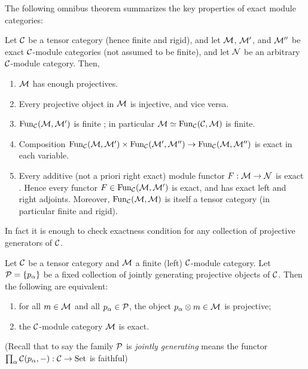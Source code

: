 \documentclass{amsart}
\begin{document}
The following omnibus theorem summarizes the key properties of exact module categories: 
\begin{theorem} \label{Thm:ExactModCatOmnibus}
	Let $\mathcal C$ be a tensor category (hence finite and rigid), and let $\mathcal M$, $\mathcal M'$, and $\mathcal M''$ be exact $\mathcal C$-module categories (not assumed to be finite), and let $\mathcal N$ be an arbitrary $\mathcal C$-module category. Then,
	\begin{enumerate}
		\item $\mathcal M$ has enough projectives. \cite[Lemma 2.7.1]{EGNO}
		\item Every projective object in $\mathcal M$  is injective, and vice versa. \cite[Cor 2.7.4]{EGNO}
		\item $\operatorname{Fun}_{\mathcal C}(\mathcal M, \mathcal M')$ is finite \cite[Prop 2.13.5]{EGNO}; in particular $\mathcal M \simeq \operatorname{Fun}_{\mathcal C}(\mathcal C, \mathcal M)$ is finite.
		\item Composition $\operatorname{Fun}_{\mathcal C}(\mathcal M, \mathcal M') \times \operatorname{Fun}_{\mathcal C}(\mathcal M', \mathcal M'') \to \operatorname{Fun}_{\mathcal C}(\mathcal M, \mathcal M'')$ is exact in each variable. \cite[Lemma 2.13.2]{EGNO}		
		\item Every additive (not a priori right exact) module functor $F:\mathcal M \to \mathcal N$ is exact \cite[Prop 2.7.8]{EGNO}. Hence every functor $F \in \operatorname{Fun}_{\mathcal C}(\mathcal M, \mathcal M')$ is exact, and has exact left and right adjoints. Moreover, $\operatorname{Fun}_{\mathcal C}(\mathcal M,\mathcal M)$ is itself a tensor category (in particular finite and rigid). 
	\end{enumerate}
\end{theorem}

\noindent In fact it is enough to check exactness condition for any collection of projective generators of $\mathcal C$. 

\begin{lemma} \label{lma:Exact_checked_on_proj_gens}
	Let $\mathcal C$ be a tensor category and $\mathcal M$ a finite (left) $\mathcal C$-module category. Let $\mathcal P = \{ p_\alpha \}$ be a fixed collection of jointly generating projective objects of  $\mathcal C$. Then the following are equivalent:
	\begin{enumerate}
		\item for all $m \in \mathcal M$ and all $p_\alpha \in \mathcal P$, the object $p_\alpha \otimes m \in \mathcal M$ is projective;
		\item the $\mathcal C$-module category $\mathcal M$ is exact.
	\end{enumerate}
	(Recall that to say the family $\mathcal P$ is {\em jointly generating} means the functor $\prod_\alpha\mathcal C(p_\alpha, -): \mathcal C \to \mathrm{Set}$ is faithful)
\end{lemma}
\end{document}
